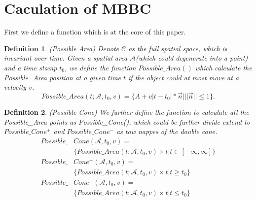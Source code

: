 \documentclass[sigplan]{acmart}
\newtheorem{myDef}{Definition}
\begin{document}
\section{Caculation of MBBC}
First we define a function which is at the core of this paper.
\begin{myDef}
  (Possible Area) Denote $\mathcal{C}$ as the full spatial space, which is invariant over time. Given a spatial area $\mathcal{A}$(which could degenerate into a point) and a time stamp $t_0$, we define the function $Possible\_Area()$ which calculate the Possible\_Area position at a given time $t$ if the object could at most move at a velocity $v$.
  $$
  Possible\_Area(t;\mathcal{A},t_0,v) = \{A+v|t-t_0|*\vec{n} \big| ||\vec{n}|| \leq 1\}.
  $$
\end{myDef}
\begin{myDef}
  (Possible Cone) We further define the function to calculate all the Possible\_Area points as Possible\_Cone(), which could be further divide extend to $Possible\_Cone^+$ and $Possible\_Cone^-$ as tow nappes of the double cone.
  $$
  \begin{aligned}
  Possible\_&Cone(\mathcal{A},t_0,v)=\\
  &\{Possible\_Area(t;\mathcal{A},t_0,v)\times t | t\in [-\infty,\infty]\}\\
  Possible\_&Cone^+(\mathcal{A},t_0,v)=\\
  &\{Possible\_Area(t;\mathcal{A},t_0,v)\times t \big | t\geq t_0\}\\
  Possible\_&Cone^-(\mathcal{A},t_0,v)=\\
  &\{Possible\_Area(t;\mathcal{A},t_0,v)\times t \big | t\leq t_0\}
  \end{aligned}
  $$
\end{myDef}
\end{document}
